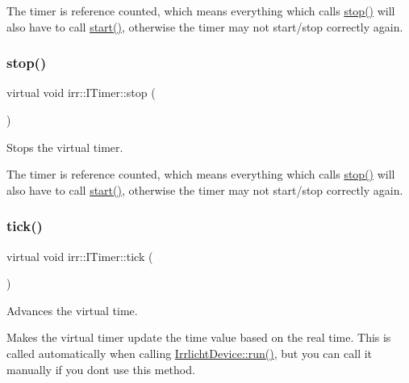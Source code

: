 The timer is reference counted, which means everything which calls \hyperlink{classirr_1_1ITimer_a649e7294fafc6e6de00f9a4dc6894c16}{stop()} will also have to call \hyperlink{classirr_1_1ITimer_a9467dc5a72de3869712715d0473c9697}{start()}, otherwise the timer may not start/stop correctly again. \mbox{\label{classirr_1_1ITimer_a649e7294fafc6e6de00f9a4dc6894c16}} 
\subsubsection{\texorpdfstring{stop()}{stop()}\hspace{0.1cm}{\footnotesize\ttfamily [2/2]}}
{\footnotesize\ttfamily virtual void irr\+::\+I\+Timer\+::stop (\begin{DoxyParamCaption}{ }\end{DoxyParamCaption})\hspace{0.3cm}{\ttfamily [pure virtual]}}



Stops the virtual timer. 

The timer is reference counted, which means everything which calls \hyperlink{classirr_1_1ITimer_a649e7294fafc6e6de00f9a4dc6894c16}{stop()} will also have to call \hyperlink{classirr_1_1ITimer_a9467dc5a72de3869712715d0473c9697}{start()}, otherwise the timer may not start/stop correctly again. \mbox{\label{classirr_1_1ITimer_a50ee793711cace4410e1f9c9e1ce20c6}} 
\subsubsection{\texorpdfstring{tick()}{tick()}\hspace{0.1cm}{\footnotesize\ttfamily [1/2]}}
{\footnotesize\ttfamily virtual void irr\+::\+I\+Timer\+::tick (\begin{DoxyParamCaption}{ }\end{DoxyParamCaption})\hspace{0.3cm}{\ttfamily [pure virtual]}}



Advances the virtual time. 

Makes the virtual timer update the time value based on the real time. This is called automatically when calling \hyperlink{classirr_1_1IrrlichtDevice_a0489f8151dc43f6f41503ffb5a160b35}{Irrlicht\+Device\+::run()}, but you can call it manually if you don\textquotesingle{}t use this method. \mbox{\label{classirr_1_1ITimer_a50ee793711cace4410e1f9c9e1ce20c6}} 
